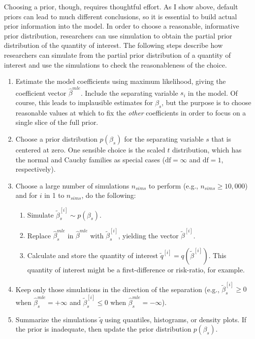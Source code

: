 \documentclass[12pt]{article}
\begin{document}
Choosing a prior, though, requires thoughtful effort. 
As I show above, default priors can lead to much different conclusions, so it is essential to build actual prior information into the model. 
In order to choose a reasonable, informative prior distribution, researchers can use simulation to obtain the partial prior distribution of the quantity of interest.
The following steps describe how researchers can simulate from the partial prior distribution of a quantity of interest and use the simulations to check the reasonableness of the choice.
\begin{enumerate}
\item Estimate the model coefficients using maximum likelihood, giving the coefficient vector $\hat{\beta}^{mle}$. 
Include the separating variable $s_i$ in the model. 
Of course, this leads to implausible estimates for $\beta_s$, but the purpose is to choose reasonable values at which to fix the \emph{other} coefficients in order to focus on a single slice of the full prior. 
\item Choose a prior distribution $p(\beta_s)$ for the separating variable $s$ that is centered at zero. 
One sensible choice is the scaled $t$ distribution, which has the normal and Cauchy families as special cases ($\text{df} = \infty$ and $\text{df} = 1$, respectively). 
\item Choose a large number of simulations $n_{sims}$ to perform (e.g., $n_{sims} \geq 10,000$) and for $i$ in 1 to $n_{sims}$, do the following:
	\begin{enumerate}
	\item Simulate $\tilde{\beta}^{[i]}_s \sim p(\beta_s)$.
	\item Replace $\hat{\beta}_s^{mle}$ in $\hat{\beta}^{mle}$ with $\tilde{\beta}^{[i]}_s$, yielding the vector $\tilde{\beta}^{[i]}$.
	\item Calculate and store the quantity of interest $\tilde{q}^{[i]} = q\left(\tilde{\beta}^{[i]}\right)$. 
	This quantity of interest might be a first-difference or risk-ratio, for example.
	\end{enumerate}
\item Keep only those simulations in the direction of the separation (e.g., $\tilde{\beta}_s^{[i]} \geq 0$ when $\hat{\beta}_{s}^{mle} = +\infty$ and $\tilde{\beta}_s^{[i]} \leq 0$ when $\hat{\beta}_{s}^{mle} = -\infty$).
\item Summarize the simulations $\tilde{q}$ using quantiles, histograms, or density plots. 
If the prior is inadequate, then update the prior distribution $p(\beta_s)$.
\end{enumerate}
\end{document}
